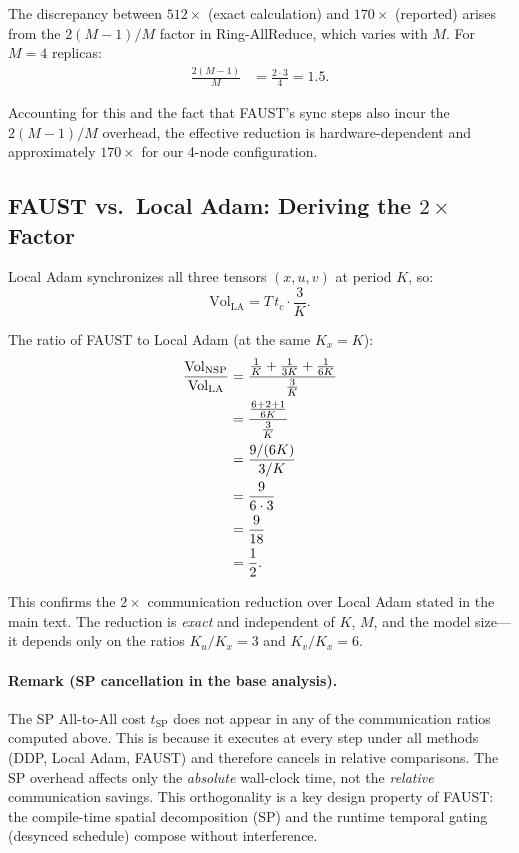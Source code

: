 \documentclass{article}
\begin{document}
The discrepancy between $512\times$ (exact calculation) and $170\times$
(reported) arises from the $2(M-1)/M$ factor in Ring-AllReduce, which
varies with $M$. For $M = 4$ replicas:
\begin{align}
\frac{2(M-1)}{M} &= \frac{2 \cdot 3}{4} = 1.5.
\label{eq:ring_factor}
\end{align}

Accounting for this and the fact that FAUST's sync steps also incur
the $2(M-1)/M$ overhead, the effective reduction is hardware-dependent
and approximately $170\times$ for our 4-node configuration.

\subsection{FAUST vs.\ Local Adam: Deriving the \texorpdfstring{$2\times$}{2x} Factor}

Local Adam synchronizes all three tensors $(x, u, v)$ at period $K$, so:
\begin{equation}
\text{Vol}_{\text{LA}} = T\,t_c \cdot \frac{3}{K}.
\label{eq:vol_la}
\end{equation}

The ratio of FAUST to Local Adam (at the same $K_x = K$):
\begin{align}
\frac{\text{Vol}_{\text{NSP}}}{\text{Vol}_{\text{LA}}}
&= \frac{\frac{1}{K} + \frac{1}{3K} + \frac{1}{6K}}
{\frac{3}{K}}
\notag \\
&= \frac{\frac{6 + 2 + 1}{6K}}{\frac{3}{K}}
\notag \\
&= \frac{9/(6K)}{3/K}
\notag \\
&= \frac{9}{6 \cdot 3}
\notag \\
&= \frac{9}{18}
\notag \\
&= \frac{1}{2}.
\label{eq:nsp_vs_la}
\end{align}

This confirms the $2\times$ communication reduction over Local Adam
stated in the main text. The reduction is \emph{exact} and independent of
$K$, $M$, and the model size---it depends only on the ratios
$K_u/K_x = 3$ and $K_v/K_x = 6$.

\paragraph{Remark (SP cancellation in the base analysis).}
The SP All-to-All cost $t_{\text{SP}}$ does not appear in any of the
communication ratios computed above. This is because it executes at every
step under all methods (DDP, Local Adam, FAUST) and therefore cancels
in relative comparisons. The SP overhead affects only the \emph{absolute}
wall-clock time, not the \emph{relative} communication savings. This
orthogonality is a key design property of FAUST: the compile-time
spatial decomposition (SP) and the runtime temporal gating (desynced
schedule) compose without interference.
\end{document}
